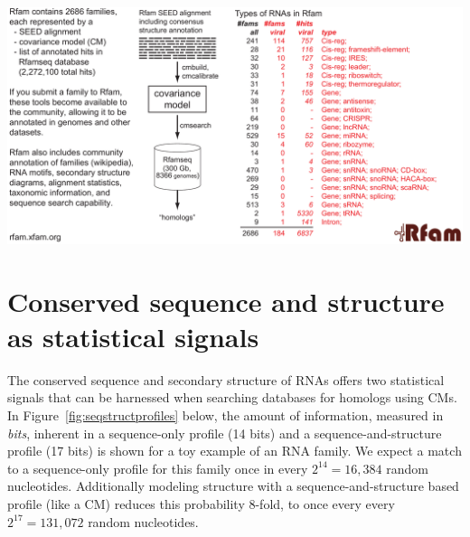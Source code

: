 \documentclass[custom,landscape,final,30pt,plainboxedsections]{sciposter-titleskipsmall}
\begin{document}
\begin{multicols}{3}
\begin{center}
\includegraphics[width=21.5in]{figs/rfam-poster}
\end{center}

\columnbreak

\section*{Conserved sequence and 
structure as statistical signals}
The conserved sequence and secondary structure of RNAs offers two
statistical signals that can be harnessed when searching
databases for homologs using CMs. In
Figure~\ref{fig:seqstructprofiles} below, the amount of information,
measured in \emph{bits}, inherent in a sequence-only profile (14
bits) and a sequence-and-structure profile (17 bits) is shown for a
toy example of an RNA family. We expect a match to a sequence-only
profile for this family once in every $2^{14}=16,384$ random
nucleotides.  Additionally modeling structure with a
sequence-and-structure based profile (like a CM) reduces this
probability 8-fold, to once every every $2^{17}=131,072$
random nucleotides.


\end{multicols}
\end{document}
